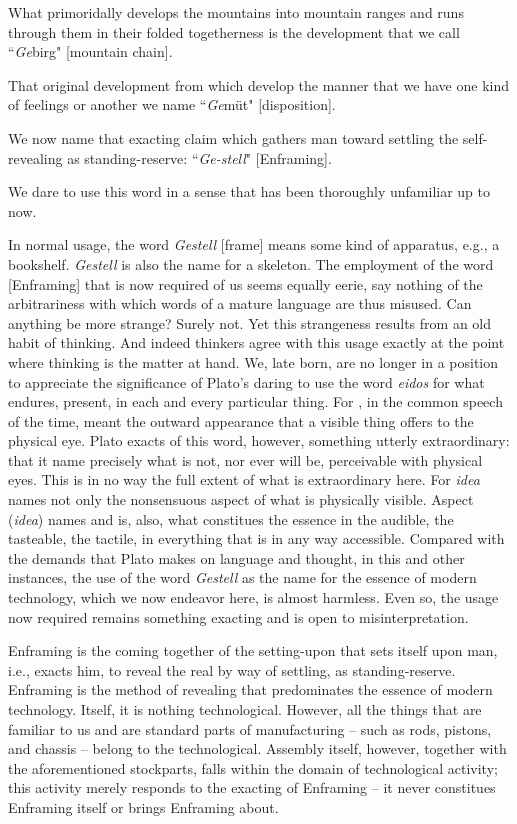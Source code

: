 \documentclass[12pt]{article}
\begin{document}
What primoridally develops the mountains into mountain ranges and runs through them in their folded togetherness is the development that we call ``\textit{Ge}birg" [mountain chain].

That original development from which develop the manner that we have one kind of feelings or another we name ``\textit{Ge}m\"{u}t" [disposition].

We now name that exacting claim which gathers man toward settling the self-revealing as standing-reserve: ``\textit{Ge-stell}" [Enframing].

We dare to use this word in a sense that has been thoroughly unfamiliar up to now.

In normal usage, the word \textit{Gestell} [frame] means some kind of apparatus, e.g., a bookshelf. \textit{Gestell} is also the name for a skeleton. The employment of the word  [Enframing] that is now required of us seems equally eerie, say nothing of the arbitrariness with which words of a mature language are thus misused. Can anything be more strange? Surely not. Yet this strangeness results from an old habit of thinking. And indeed thinkers agree with this usage exactly at the point where thinking is the matter at hand.  We, late born, are no longer in a position to appreciate the significance of Plato's daring to use the word \textit{eidos} for what endures, present, in each and every particular thing. For , in the common speech of the time, meant the outward appearance that a visible thing offers to the physical eye. Plato exacts of this word, however, something utterly extraordinary: that it name precisely what is not, nor ever will be, perceivable with physical eyes. This is in no way the full extent of what is extraordinary here. For \textit{idea} names not only the nonsensuous aspect of what is physically visible. Aspect (\textit{idea}) names and is, also, what constitues the essence in the audible, the tasteable, the tactile, in everything that is in any way accessible. Compared with the demands that Plato makes on language and thought, in this and other instances, the use of the word \textit{Gestell} as the name for the essence of modern technology, which we now endeavor here, is almost harmless. Even so, the usage now required remains something exacting and is open to misinterpretation.

Enframing is the coming together of the setting-upon that sets itself upon man, i.e., exacts him, to reveal the real by way of settling, as standing-reserve. Enframing is the method of revealing that predominates the essence of modern technology. Itself, it is nothing technological. However, all the things that are familiar to us and are standard parts of manufacturing -- such as rods, pistons, and chassis -- belong to the technological. Assembly itself, however, together with the aforementioned stockparts, falls within the domain of technological activity; this activity merely responds to the exacting of Enframing -- it never constitues Enframing itself or brings Enframing about.
\end{document}
